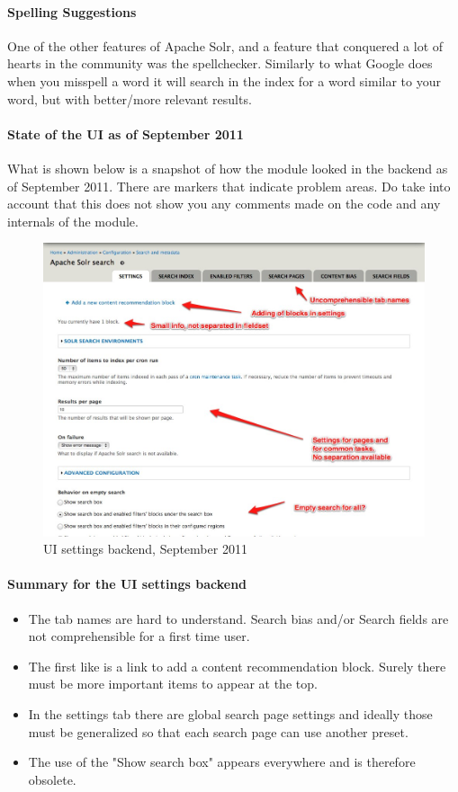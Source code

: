 \paragraph{Spelling Suggestions}
One of the other features of Apache Solr, and a feature that conquered a lot of hearts in the community was the spellchecker. Similarly to what Google does when you misspell a word it will search in the index for a word similar to your word, but with better/more relevant results.

\paragraph{State of the UI as of September 2011} What is shown below is a snapshot of how the module looked in the backend as of September 2011. There are markers that indicate problem areas. Do take into account that this does not show you any comments made on the code and any internals of the module.
\begin{figure}[H]
     \includegraphics[width=\textwidth]{images/apachesolr_ui_backend_september_2011_1.jpg}
     \caption{UI settings backend, September 2011}
\end{figure}
\paragraph{Summary for the UI settings backend}
\begin{itemize}
\item The tab names are hard to understand. Search bias and/or Search fields are not comprehensible for a first time user.
\item The first like is a link to add a content recommendation block. Surely there must be more important items to appear at the top. 
\item In the settings tab there are global search page settings and ideally those must be generalized so that each search page can use another preset.
\item The use of the "Show search box" appears everywhere and is therefore obsolete.
\end{itemize}

